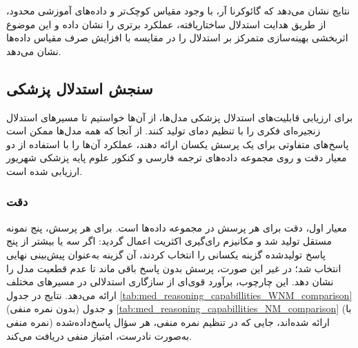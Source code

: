 نتایج نشان می‌دهد که گائوکرنا آر، با وجود مقیاس کوچک‌تر و داده‌های آموزشی محدود، از طریق هدایت استدلال ساختاریافته، عملکرد برتری را نشان داده و این موضوع اثربخشی بهینه‌سازی متمرکز بر استدلال را در مقایسه با افزایش صرف مقیاس داده‌ها نشان می‌دهد.

\subsection{
سنجش استدلال پزشکی
}
برای ارزیابی قابلیت‌های استدلال پزشکی مدل‌ها، از آن‌ها خواستیم تا مسیرهای استدلال زنجیره‌ای فکری را با تنظیم دمای
تولید کنند. از آنجا که همه مدل‌ها ممکن است پاسخ‌های متفاوتی برای یک پرسش یکسان ارائه دهند، عملکرد آن‌ها را با استفاده از دو معیار دقت و 
\cite{b84}
روی مجموعه داده‌های ترجمه فارسی 
\cite{b14}
و کنکور علوم پایه پزشکی شهریور
ارزیابی شده است.
\subsubsection{
دقت
}
معیار اول، دقت برای هر پرسش در مجموعه داده‌ها است. برای هر پرسش، پنج نمونه مستقل تولید شد و مکانیزم رای‌گیری اکثریت اعمال گردید: اگر سه یا بیشتر از پنج پاسخ تولیدشده گزینه یکسانی را انتخاب کردند، آن گزینه به‌عنوان پیش‌بینی نهایی انتخاب شد؛ در غیر این صورت، پرسش بدون پاسخ باقی ماند تا عدم قطعیت مدل را نشان دهد. این چارچوب، برآورد قوی‌ای از سازگاری استدلالی در مسیرهای مختلف ارائه می‌دهد. نتایج در جدول 
\ref{tab:med_reasoning_capabillities_WNM_comparison}
(بدون نمره منفی) و جدول
\ref{tab:med_reasoning_capabillities_NM_comparison}
(با نمره منفی) ارائه شده‌اند، جایی که در تنظیم نمره منفی، هر سؤال پاسخ‌داده‌شده به‌صورت نادرست، امتیاز منفی
دریافت می‌کند.


